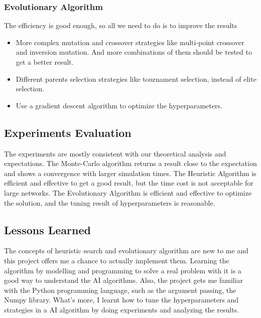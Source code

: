 \documentclass{article}
\begin{document}
\subsubsection{Evolutionary Algorithm}
The efficiency is good enough, so all we need to do is to improve the results
\begin{itemize}
    \item More complex mutation and crossover strategies like multi-point crossover and inversion mutation. And more combinations of them should be tested to get a better result.
    \item Different parents selection strategies like tournament selection, instead of elite selection.
    \item Use a gradient descent algorithm to optimize the hyperparameters.
\end{itemize}

\subsection{Experiments Evaluation}

The experiments are mostly consistent with our theoretical analysis and expectations. The Monte-Carlo algorithm returns a result close to the expectation and shows a convergence with larger simulation times. The Heuristic Algorithm is efficient and effective to get a good result, but the time cost is not acceptable for large networks. The Evolutionary Algorithm is efficient and effective to optimize the solution, and the tuning result of hyperparameters is reasonable.

\subsection{Lessons Learned}

The concepts of heuristic search and evolutionary algorithm are new to me and this project offers me a chance to actually implement them. Learning the algorithm by modelling and programming to solve a real problem with it is a good way to understand the AI algorithms. Also, the project gets me familiar with the Python programming language, such as the argument passing, the Numpy library. What's more, I learnt how to tune the hyperparameters and strategies in a AI algorithm by doing experiments and analyzing the results.
\end{document}
